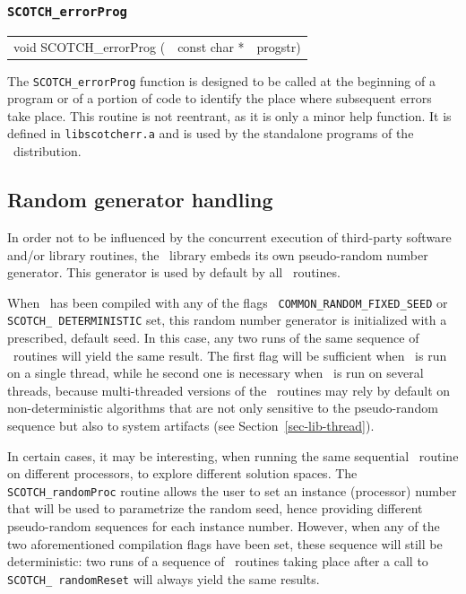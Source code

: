 \subsubsection{{\tt SCOTCH\_errorProg}}

\begin{itemize}
\progsyn

{\tt\begin{tabular}{l@{}ll}
void SCOTCH\_errorProg ( & const char * & progstr)
\end{tabular}}

\progdes

The {\tt SCOTCH\_errorProg} function is designed to be called at
the beginning of a program or of a portion of code to identify the
place where subsequent errors take place.
This routine is not reentrant, as it is only a minor help function. It
is defined in {\tt lib\lbt scotch\lbt err.a} and is used by the
standalone programs of the \scotch\ distribution.
\end{itemize}

\subsection{Random generator handling}
\label{sec-lib-random}

In order not to be influenced by the concurrent execution of third-party
software and/or library routines, the \libscotch\ library embeds its
own pseudo-random number generator. This generator is used by default
by all \libscotch\ routines.

When \scotch\ has been compiled with any of the flags {\tt
COMMON\_\lbt RANDOM\_\lbt FIXED\_\lbt SEED} or {\tt SCOTCH\_\lbt
DETERMINISTIC} set, this random number generator is initialized with
a prescribed, default seed. In this case, any two runs of the same
sequence of \libscotch\ routines will yield the same result. The
first flag will be sufficient when \scotch\ is run on a single thread,
while he second one is necessary when \scotch\ is run on several
threads, because multi-threaded versions of the \libscotch\ routines
may rely by default on non-deterministic algorithms that are not only
sensitive to the pseudo-random sequence but also to system artifacts
(see Section~\ref{sec-lib-thread}).

In certain cases, it may be interesting, when running the same
sequential \scotch\ routine on different processors, to explore
different solution spaces. The \texttt{SCOTCH\_\lbt random\lbt Proc}
routine allows the user to set an instance (processor) number that
will be used to parametrize the random seed, hence providing different
pseudo-random sequences for each instance number. However, when any of
the two aforementioned compilation flags have been set, these sequence
will still be deterministic: two runs of a sequence of
\libscotch\ routines taking place after a call to \texttt{SCOTCH\_\lbt
random\lbt Reset} will always yield the same results.

